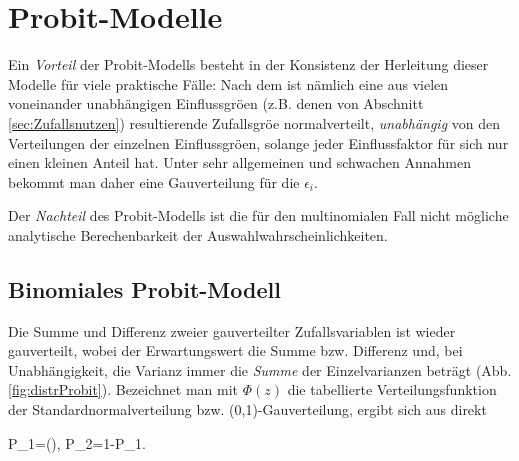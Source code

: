 \section{\label{sec:Probit}Probit-Modelle}


Ein \textit{Vorteil} der Probit-Modells besteht in der
Konsistenz der Herleitung dieser Modelle f\"ur viele praktische
F\"alle:
Nach dem  ist n\"amlich eine aus vielen voneinander
unabh\"angigen Einflussgr\"o\3en (z.B. denen von 
Abschnitt \ref{sec:Zufallsnutzen}) resultierende Zufallsgr\"o\3e 
normalverteilt, \textit{unabh\"angig} von den Verteilungen der einzelnen
Einflussgr\"o\3en, solange jeder Einflussfaktor f\"ur sich nur einen
kleinen Anteil hat. Unter sehr allgemeinen und schwachen Annahmen
bekommt man daher eine Gau\3verteilung f\"ur die $\epsilon_i$.

Der \textit{Nachteil} des Probit-Modells ist die f\"ur den multinomialen
Fall nicht m\"ogliche analytische Berechenbarkeit der
Auswahlwahrscheinlichkeiten.

\subsection{\label{sec:ProbitBinom}Binomiales Probit-Modell}

Die Summe und Differenz zweier gau\3verteilter Zufallsvariablen ist
wieder gau\3verteilt, wobei der Erwartungswert die Summe
bzw. Differenz und, bei Unabh\"angigkeit,  die Varianz immer die \textit{Summe} der
Einzelvarianzen betr\"agt (Abb. \ref{fig:distrProbit}). Bezeichnet man mit $\Phi(z)$ die
tabellierte Verteilungsfunktion der Standardnormalverteilung bzw. 
(0,1)-Gau\3verteilung, ergibt sich aus
 direkt

{P_1=\Phi\left(\right),
\quad P_2=1-P_1.
}

